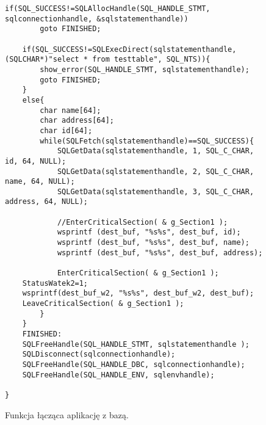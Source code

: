\documentclass[a4paper,twoside,12pt]{mgr}
\begin{document}
  \begin{figure}[H]
\centering
\begin{lstlisting}[frame=single]      
    if(SQL_SUCCESS!=SQLAllocHandle(SQL_HANDLE_STMT, sqlconnectionhandle, &sqlstatementhandle))
        goto FINISHED;

    if(SQL_SUCCESS!=SQLExecDirect(sqlstatementhandle, (SQLCHAR*)"select * from testtable", SQL_NTS)){
        show_error(SQL_HANDLE_STMT, sqlstatementhandle);
        goto FINISHED;
    }
    else{
        char name[64];
        char address[64];
        char id[64];
        while(SQLFetch(sqlstatementhandle)==SQL_SUCCESS){
            SQLGetData(sqlstatementhandle, 1, SQL_C_CHAR, id, 64, NULL);
            SQLGetData(sqlstatementhandle, 2, SQL_C_CHAR, name, 64, NULL);
            SQLGetData(sqlstatementhandle, 3, SQL_C_CHAR, address, 64, NULL);
            
            //EnterCriticalSection( & g_Section1 );
            wsprintf (dest_buf, "%s%s", dest_buf, id);
            wsprintf (dest_buf, "%s%s", dest_buf, name);
            wsprintf (dest_buf, "%s%s", dest_buf, address);
            
            EnterCriticalSection( & g_Section1 );
	StatusWatek2=1;
	wsprintf(dest_buf_w2, "%s%s", dest_buf_w2, dest_buf);
	LeaveCriticalSection( & g_Section1 );	
        }
    }
	FINISHED:
	SQLFreeHandle(SQL_HANDLE_STMT, sqlstatementhandle );
	SQLDisconnect(sqlconnectionhandle);
    SQLFreeHandle(SQL_HANDLE_DBC, sqlconnectionhandle);
    SQLFreeHandle(SQL_HANDLE_ENV, sqlenvhandle);
    
}
\end{lstlisting}
\caption{Funkcja łącząca aplikację z bazą.}%
\label{rys:etykieta}
\end{figure}
\end{document}
